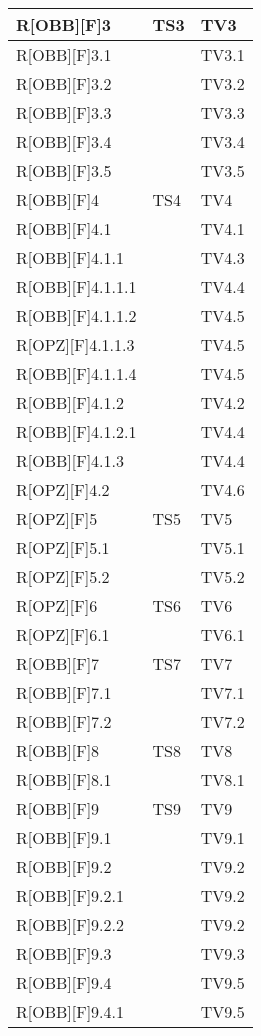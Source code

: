 	\begin{table}[h]
			\begin{tabular}{|p{0.3\textwidth}|p{}|p{}|}
			\midrule
			
			R[OBB][F]3 & TS3  & TV3 \\ \midrule
			R[OBB][F]3.1 &  & TV3.1 \\ \midrule
			R[OBB][F]3.2 &  & TV3.2 \\ \midrule
			R[OBB][F]3.3 &  & TV3.3 \\ \midrule
			R[OBB][F]3.4 &  & TV3.4 \\ \midrule
			R[OBB][F]3.5 &  & TV3.5 \\ \midrule
			R[OBB][F]4 & TS4 & TV4 \\ \midrule
			R[OBB][F]4.1 &  & TV4.1 \\ \midrule
			R[OBB][F]4.1.1 &  & TV4.3 \\ \midrule
			R[OBB][F]4.1.1.1 &  & TV4.4 \\ \midrule
			R[OBB][F]4.1.1.2 &  & TV4.5 \\ \midrule
			R[OPZ][F]4.1.1.3 &  & TV4.5 \\ \midrule
			R[OBB][F]4.1.1.4 &  & TV4.5 \\ \midrule
			R[OBB][F]4.1.2 &  & TV4.2 \\ \midrule
			R[OBB][F]4.1.2.1 &  & TV4.4 \\ \midrule
			R[OBB][F]4.1.3 &  & TV4.4 \\ \midrule
			R[OPZ][F]4.2 &  & TV4.6 \\ \midrule
			R[OPZ][F]5 & TS5 & TV5 \\ \midrule
			R[OPZ][F]5.1 &  & TV5.1 \\ \midrule
			R[OPZ][F]5.2 &  & TV5.2 \\ \midrule
			R[OPZ][F]6 & TS6 & TV6 \\ \midrule
			R[OPZ][F]6.1 &  & TV6.1 \\ \midrule
			R[OBB][F]7 & TS7 & TV7 \\ \midrule
			R[OBB][F]7.1 &  & TV7.1 \\ \midrule
			R[OBB][F]7.2 &  & TV7.2 \\ \midrule
			R[OBB][F]8 & TS8 & TV8 \\ \midrule
			R[OBB][F]8.1 &  & TV8.1 \\ \midrule
			R[OBB][F]9 & TS9 & TV9 \\ \midrule
			R[OBB][F]9.1 &  & TV9.1 \\ \midrule
			R[OBB][F]9.2 &  & TV9.2 \\ \midrule
			R[OBB][F]9.2.1 &  & TV9.2 \\ \midrule
			R[OBB][F]9.2.2 &  & TV9.2 \\ \midrule
			R[OBB][F]9.3 &  & TV9.3 \\ \midrule
			R[OBB][F]9.4 &  & TV9.5 \\ \midrule
			R[OBB][F]9.4.1 &  & TV9.5 \\ \midrule

		\end{tabular}
	\end{table}
	\newpage
	
